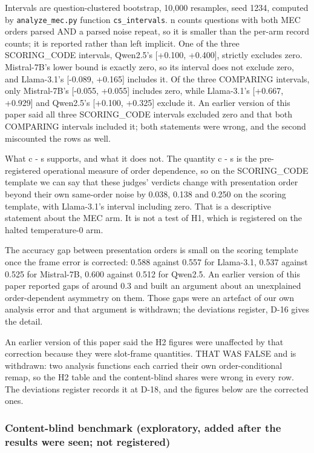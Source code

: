 Intervals are question-clustered bootstrap, 10,000 resamples, seed 1234, computed by
\texttt{analyze\_mec.py} function \texttt{cs\_intervals}. n counts questions with both MEC orders parsed AND a
parsed noise repeat, so it is smaller than the per-arm record counts; it is reported rather than
left implicit. One of the three SCORING\_CODE intervals, Qwen2.5's {[}+0.100, +0.400{]}, strictly excludes zero.
Mistral-7B's lower bound is exactly zero, so its interval does not exclude zero, and Llama-3.1's
{[}-0.089, +0.165{]} includes it. Of the three COMPARING intervals, only Mistral-7B's {[}-0.055, +0.055{]} includes zero,
while Llama-3.1's {[}+0.667, +0.929{]} and Qwen2.5's {[}+0.100, +0.325{]} exclude it. An earlier version of
this paper said all three SCORING\_CODE intervals excluded zero and that both COMPARING intervals
included it; both statements were wrong, and the second miscounted the rows as well.

What c - s supports, and what it does not. The quantity c - s is the pre-registered operational
measure of order dependence, so on the SCORING\_CODE template we can say that these judges' verdicts
change with presentation order beyond their own same-order noise by 0.038, 0.138 and 0.250 on the
scoring template, with Llama-3.1's interval including zero. That is a
descriptive statement about the MEC arm. It is not a test of H1, which is registered on the halted
temperature-0 arm.

The accuracy gap between presentation orders is small on the scoring template once the frame error
is corrected: 0.588 against 0.557 for Llama-3.1, 0.537 against 0.525 for Mistral-7B, 0.600 against
0.512 for Qwen2.5. An earlier version of this paper reported gaps of around 0.3 and built an
argument about an unexplained order-dependent asymmetry on them. Those gaps were an artefact of our
own analysis error and that argument is withdrawn; the deviations register, D-16 gives the detail.

An earlier version of this paper said the H2 figures were unaffected by that correction because
they were slot-frame quantities. THAT WAS FALSE and is withdrawn: two analysis functions each
carried their own order-conditional remap, so the H2 table and the content-blind shares were wrong
in every row. The deviations register records it at D-18, and the figures below are the corrected ones.

\subsubsection{Content-blind benchmark (exploratory, added after the results were seen; not registered)}\label{content-blind-benchmark-exploratory-added-after-the-results-were-seen-not-registered}

